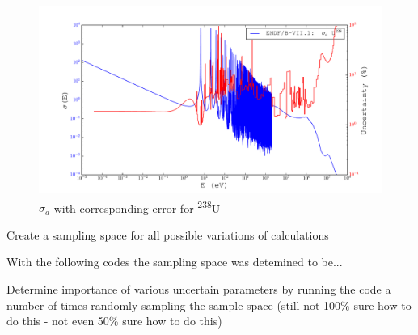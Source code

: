 \documentclass[11pt,notitlepage]{article}
\newcommand{\tss}{\textsuperscript}
\begin{document}
\begin{todolist}
  \begin{figure}[H]
    \begin{center}
      \includegraphics[width=0.77\columnwidth]{../Weighting/X_Sections/XwVar_U_238_92_a.pdf}
      \vspace{-5mm}
      \caption{$\sigma_a$ with corresponding error for \tss{238}U}
      \label{fig:XU238}
    \end{center}
  \end{figure}
  





  
    
\item{Create a sampling space for all possible variations of
  calculations}
    
  With the following codes the sampling space was detemined to be...


  
\item{Determine importance of various uncertain parameters
  by running the code a number of times randomly sampling
  the sample space (still not 100\% sure how to do this -
  not even 50\% sure how to do this)}
\end{todolist}
\end{document}
